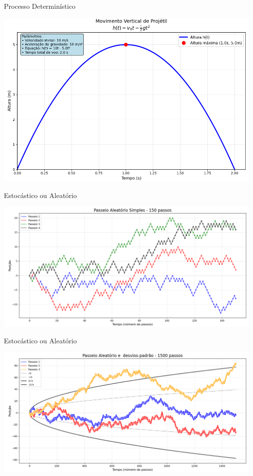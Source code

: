 \documentclass{beamer}
\begin{document}
\begin{frame}{Processo Determinístico}

\includegraphics[width=\textwidth]{projetil.png}

\end{frame}


\begin{frame}{Estocástico ou Aleatório}

\includegraphics[width=\textwidth]{srw1.png}

\end{frame}

\begin{frame}{Estocástico ou Aleatório}

\includegraphics[width=\textwidth]{srw2.png}

\end{frame}
\end{document}
